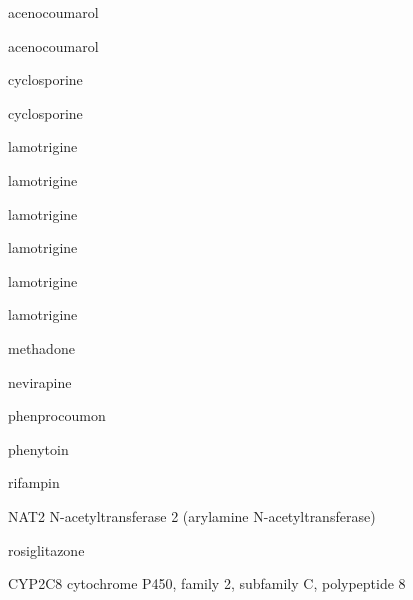 \documentclass{resume} %
\begin{document}
\begin{rSection}{ acenocoumarol }
\begin{rSection}{ acenocoumarol }
\begin{rSection}{ cyclosporine }
\begin{rSection}{ cyclosporine }
\begin{rSection}{ lamotrigine }
\begin{rSection}{ lamotrigine }
\begin{rSection}{ lamotrigine }
\begin{rSection}{ lamotrigine }
\begin{rSection}{ lamotrigine }
\begin{rSection}{ lamotrigine }
\begin{rSection}{ methadone }
\begin{rSection}{ nevirapine }
\begin{rSection}{ phenprocoumon }
\begin{rSection}{ phenytoin }
\end{rSection}
\begin{rSection}{ rifampin }
\item[]
\begin{rSubsection}{ NAT2 }{ N-acetyltransferase 2 (arylamine N-acetyltransferase) }{}{}
\item[]


\end{rSubsection}

\end{rSection}
\begin{rSection}{ rosiglitazone }
\item[]
\begin{rSubsection}{ CYP2C8 }{ cytochrome P450, family 2, subfamily C, polypeptide 8 }{}{}
\item[]


\end{rSubsection}


\end{rSection}
\end{rSection}
\end{rSection}
\end{rSection}
\end{rSection}
\end{rSection}
\end{rSection}
\end{rSection}
\end{rSection}
\end{rSection}
\end{rSection}
\end{rSection}
\end{rSection}
\end{rSection}
\end{document}
